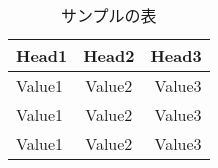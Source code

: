 \begin{table}[htb]
    \begin{center}
        \caption{サンプルの表}
        \label{table:sample}
        \begin{tabular}{lcr} \hline
            Head1 & Head2 & Head3 \\ \hline \hline
            Value1 & Value2 & Value3 \\ 
            Value1 & Value2 & Value3 \\ 
            Value1 & Value2 & Value3 \\ \hline
        \end{tabular}
    \end{center}
\end{table}

